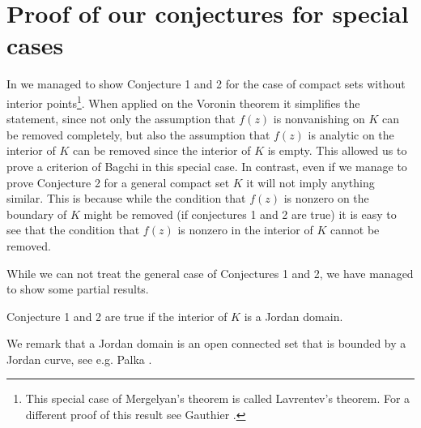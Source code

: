 \documentclass[11pt]{article}
\begin{document}
\section{Proof of our conjectures for special cases}


In \cite{Andersson} we managed to show Conjecture 1 and 2 for the case of compact sets without interior points\footnote{This special case of Mergelyan's theorem is called  Lavrent{\cprime}ev's theorem. For a different proof of this result see Gauthier \cite[Proposition 32]{Gauthier}.}. When applied on the Voronin theorem it simplifies the statement, since not only the assumption that $f(z)$ is nonvanishing on $K$ can be removed completely, but also the assumption that $f(z)$ is analytic on the interior of $K$ can be removed since the interior of $K$ is empty. This allowed us to prove a criterion of Bagchi in this special case. In contrast, even if we manage to prove Conjecture 2 for a general compact set $K$ it will not imply anything similar. This is because while the condition that $f(z)$ is nonzero on the boundary of $K$ might be removed (if conjectures 1 and 2 are true) it is easy to see that the condition that $f(z)$ is nonzero in the interior of $K$ cannot be removed. 


While we can not treat the general case of Conjectures 1 and 2, we have managed to show some partial results.
\begin{thm}
  Conjecture 1 and 2 are true if the interior of $K$ is a Jordan domain.
\end{thm}
We remark that a Jordan domain is an open connected set that is bounded by a Jordan curve, see e.g. Palka \cite[p. 34]{Palka}. 
\end{document}
